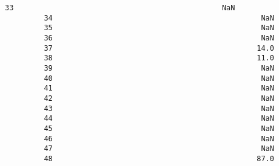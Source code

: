 \documentclass[11pt]{article}
\begin{document}
\begin{Verbatim}[commandchars=\\\{\}]
         33                                                NaN               
         34                                                NaN               
         35                                                NaN               
         36                                                NaN               
         37                                               14.0               
         38                                               11.0               
         39                                                NaN               
         40                                                NaN               
         41                                                NaN               
         42                                                NaN               
         43                                                NaN               
         44                                                NaN               
         45                                                NaN               
         46                                                NaN               
         47                                                NaN               
         48                                               87.0               
         

\end{Verbatim}
\end{document}
